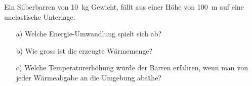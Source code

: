 
\def\MASS{10}
\begin{aufgabe}
	Ein Silberbarren von \SI{\MASS}{kg} Gewicht, fällt aus einer Höhe von \SI{100}{m} auf eine unelastische Unterlage.
	\begin{itemize}
		\item [a)] Welche Energie-Umwandlung spielt sich ab?
		\item [b)] Wie gross ist die erzeugte Wärmemenge?
		\item [c)] Welche Temperaturerhöhung würde der Barren erfahren, wenn man von jeder Wärmeabgabe an die Umgebung absähe?
	\end{itemize}
\end{aufgabe}
